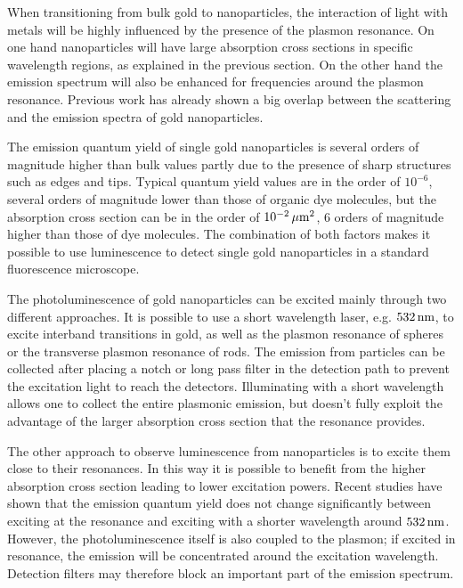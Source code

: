 When transitioning from bulk gold to nanoparticles, the interaction of light
with metals will be highly influenced by the presence of the plasmon
resonance\cite{Dulkeith2004}. On one hand nanoparticles will have large
absorption cross sections in specific wavelength regions, as explained in the
previous section. On the other hand the emission spectrum will also be enhanced
for frequencies around the plasmon resonance. Previous work has already shown
a big overlap between the scattering and the emission spectra of gold
nanoparticles\cite{Yorulmaz2012}.

The emission quantum yield of single gold nanoparticles is several orders of
magnitude higher than bulk values partly due to the presence of sharp structures
such as edges and tips. Typical quantum yield values are in the order of
$10^{-6}$\cite{Yorulmaz2012}, several orders of magnitude lower than those of
organic dye molecules, but the absorption cross section can be in the order of
$10^{-2}\,\mu\textrm{m}^2$, $6$ orders of magnitude higher than those of dye molecules. The
combination of both factors makes it possible to use luminescence to detect
single gold nanoparticles in a standard fluorescence microscope.

The photoluminescence of gold nanoparticles can be excited mainly through two
different approaches. It is possible to use a short wavelength laser, e.g.
$532\,\textrm{nm}$, to excite interband transitions in gold\cite{Beversluis2003a}, as well
as the plasmon resonance of spheres or the transverse plasmon resonance of rods.
The emission from particles can be collected after placing a notch or long pass
filter in the detection path to prevent the excitation light to reach the
detectors. Illuminating with a short wavelength allows one to collect the entire
plasmonic emission, but doesn't fully exploit the advantage of the larger
absorption cross section that the resonance provides.

The other approach to observe luminescence from nanoparticles is to excite them
close to their resonances. In this way it is possible to benefit from the higher
absorption cross section leading to lower excitation powers. Recent studies have
shown that the emission quantum yield does not change significantly between
exciting at the resonance and exciting with a shorter wavelength around
$532\,\textrm{nm}$\cite{Cheng2015}. However, the photoluminescence itself is also coupled
to the plasmon; if excited in resonance, the emission will be concentrated
around the excitation wavelength\cite{Sundararaman2014}. Detection filters may
therefore block an important part of the emission spectrum.

